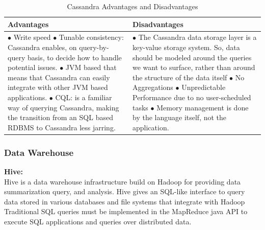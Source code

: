 \begin{table}[H]
\caption{Cassandra Advantages and Disadvantages}
\begin{center}
\begin{tabularx}{17cm}{ |p{8.5cm}|X| } 
 \hline
 \textbf{Advantages} & \textbf{Disadvantages}  \\ \hline
  $\bullet$ Write speed \newline $\bullet$ Tunable consistency: Cassandra enables, on query-by-query basis, to decide how to handle potential issues. \newline $\bullet$ JVM based that means that Cassandra can easily integrate with other JVM based applications. \newline $\bullet$ CQL: is a familiar way of querying Cassandra, making the transition from an SQL based RDBMS to Cassandra less jarring. & $\bullet$ The Cassandra data storage layer is a key-value storage system. So, data should be modeled around the queries we want to surface, rather than around the structure of the data itself \newline $\bullet$ No Aggregations \newline $\bullet$ Unpredictable Performance due to no user-scheduled tasks \newline $\bullet$ Memory management is done by the language itself, not the application.  \\ \hline

\end{tabularx}
\end{center}
\end{table}
\subsubsection{Data Warehouse}
\textbf{\normalsize{Hive:}}\\

Hive is a data warehouse infrastructure build on Hadoop for providing data summarization query, and analysis. Hive gives an SQL-like interface to query data stored in various databases and file systems that integrate with Hadoop Traditional SQL queries must be implemented in the MapReduce java API to execute SQL applications and queries over distributed data.

